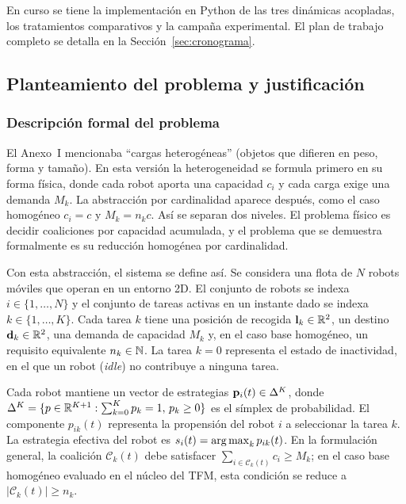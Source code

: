 En curso se tiene la implementación en Python de las tres dinámicas acopladas, los
tratamientos comparativos y la campaña experimental. El plan de trabajo
completo se detalla en la Sección~\ref{sec:cronograma}.

\subsection{Planteamiento del problema y justificación}
\label{sec:planteamiento}

\subsubsection{Descripción formal del problema}

El Anexo~I mencionaba ``cargas heterogéneas'' (objetos que difieren
en peso, forma y tamaño). En esta versión la heterogeneidad se formula primero en
su forma física, donde cada robot aporta una capacidad $c_i$ y cada carga exige una demanda
$M_k$. La abstracción por cardinalidad aparece después, como el caso homogéneo
$c_i=c$ y $M_k=n_kc$. Así se separan dos niveles. El problema físico es decidir
coaliciones por capacidad acumulada, y el problema que se demuestra formalmente
es su reducción homogénea por cardinalidad.

Con esta abstracción, el sistema se define así. Se considera una flota de $N$ robots móviles que
operan en un entorno 2D. El conjunto de robots se indexa
$i \in \{1, \ldots, N\}$ y el conjunto de tareas activas en un instante dado se indexa
$k \in \{1, \ldots, K\}$. Cada tarea $k$ tiene una posición de recogida
$\mathbf{l}_k \in \mathbb{R}^2$, un destino $\mathbf{d}_k \in \mathbb{R}^2$, una demanda de capacidad
$M_k$ y, en el caso base homogéneo, un requisito equivalente $n_k \in \mathbb{N}$. La tarea
$k=0$ representa el estado de inactividad, en el que un robot (\textit{idle}) no
contribuye a ninguna tarea.

Cada robot mantiene un vector de estrategias $\mathbf{p}_i(t) \in \Delta^K$,
donde $\Delta^K = \{p \in \mathbb{R}^{K+1} : \sum_{k=0}^K p_k = 1,\, p_k \geq 0\}$
es el símplex de probabilidad. El componente $p_{ik}(t)$ representa la propensión
del robot $i$ a seleccionar la tarea $k$. La estrategia efectiva del robot es
$s_i(t) = \operatorname*{arg\,max}_k p_{ik}(t)$. En la formulación general, la coalición
$\mathcal{C}_k(t)$ debe satisfacer $\sum_{i\in\mathcal{C}_k(t)} c_i \geq M_k$;
en el caso base homogéneo evaluado en el
núcleo del TFM, esta condición se reduce a $|\mathcal{C}_k(t)| \geq n_k$.

